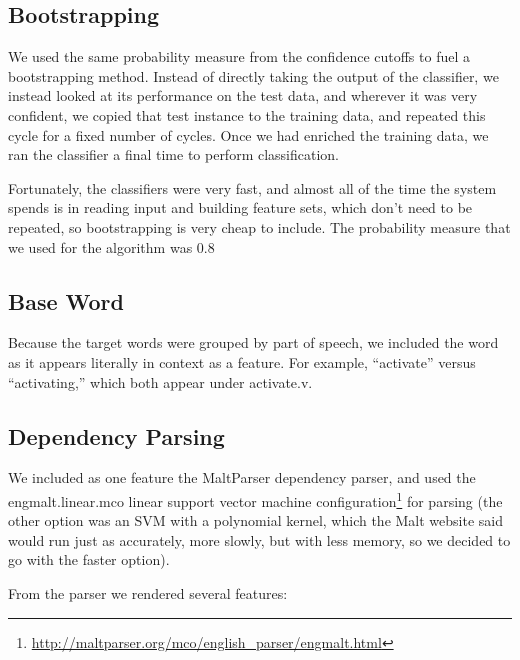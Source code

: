 \documentclass{article}
\begin{document}

\subsection{Bootstrapping}

We used the same probability measure from the confidence cutoffs to fuel a
bootstrapping method.  Instead of directly taking the output of the classifier,
we instead looked at its performance on the test data, and wherever it was very
confident, we copied that test instance to the training data, and repeated this
cycle for a fixed number of cycles.  Once we had enriched the training data, we
ran the classifier a final time to perform classification.

Fortunately, the classifiers were very fast, and almost all of the time the
system spends is in reading input and building feature sets, which don't need
to be repeated, so bootstrapping is very cheap to include.  The probability measure that we used for the algorithm was 0.8



\subsection{Base Word}

Because the target words were grouped by part of speech, we included the word
as it appears literally in context as a feature.  For example, ``activate''
versus ``activating,'' which both appear under activate.v.

\subsection{Dependency Parsing}

We included as one feature the MaltParser dependency parser, and used the
engmalt.linear.mco linear support vector machine
configuration\footnote{\url{http://maltparser.org/mco/english_parser/engmalt.html}}
for parsing (the other option was an SVM with a polynomial kernel, which the
Malt website said would run just as accurately, more slowly, but with less
memory, so we decided to go with the faster option).

From the parser we rendered several features:
\end{document}
